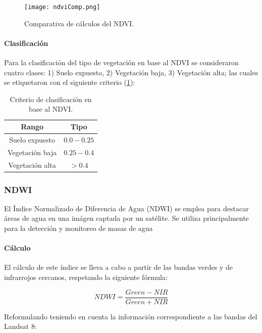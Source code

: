 \begin{figure}[H]
	\texttt{[image: ndviComp.png]}
	\centering
	\caption{Comparativa de cálculos del NDVI.}
	\label{fig:ndvi-comp}
\end{figure}

\paragraph{Clasificación} \label{clasificacion}

Para la clasificación del tipo de vegetación en base al NDVI se consideraron cuatro clases: 1) Suelo expuesto, 2) Vegetación baja, 3) Vegetación alta; las cuales se etiquetaron con el siguiente criterio (\tablename    \ref{table:ndvi-criterio}): 

\onehalfspacing
\begin{table}[H]
\begin{center}
	\begin{tabular}{|c | c |} 
		\hline
		\textbf{Rango} & \textbf{Tipo}\\
		\hline
		Suelo expuesto & $0.0-0.25$ \\
		\hline
		Vegetación baja & $0.25-0.4$ \\
		\hline
		Vegetación alta & $> 0.4$ \\
		\hline
	\end{tabular}
\end{center}
\caption{Criterio de clasificación en base al NDVI.}
\label{table:ndvi-criterio}
\end{table}
\singlespacing

\subsubsection{NDWI}

El Índice Normalizado de Diferencia de Agua (NDWI) se emplea para destacar áreas de agua en una imágen captada por un satélite. Se utiliza principalmente para la detección y monitoreo de masas de agua

\paragraph{Cálculo}

El cálculo de este índice se lleva a cabo a partir de las bandas verdes y de infrarrojos cercanos, respetando la siguiente fórmula:

$$NDWI = \frac{Green - NIR}{Green + NIR}$$

Reformulando teniendo en cuenta la información correspondiente a las bandas del Landsat 8:

